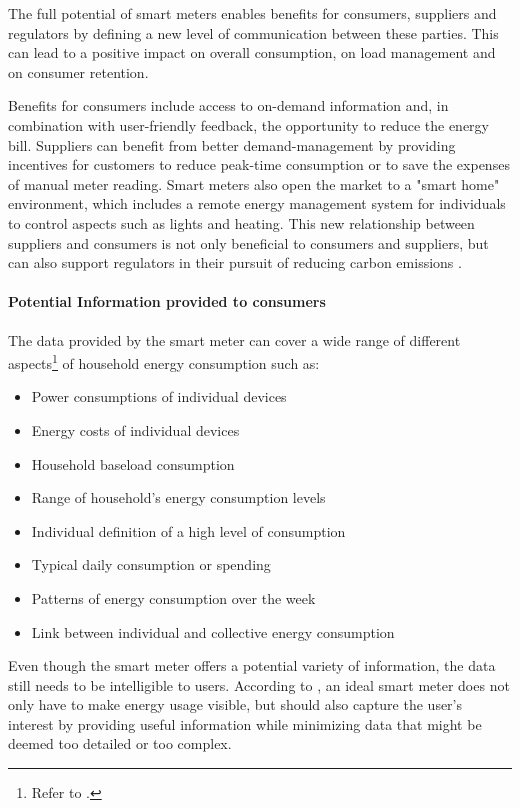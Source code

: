 The full potential of smart meters enables benefits for consumers, suppliers and regulators by defining a new level of communication between these parties.  This can lead to a positive impact on overall consumption, on load management and on consumer retention.

Benefits for consumers include access to on-demand information and, in combination with user-friendly feedback, the opportunity to reduce the energy bill.
Suppliers can benefit from better demand-management by providing incentives for customers to reduce peak-time consumption or to save the expenses of manual meter reading. Smart meters also open the market to a "smart home" environment, which includes a remote energy management system for individuals to control aspects such as lights and heating.
This new relationship between suppliers and consumers is not only beneficial to consumers and suppliers, but can also support regulators in their pursuit of reducing carbon emissions  \citep{Darby2008}.

\paragraph{Potential Information provided to consumers}

The data provided by the smart meter can cover a wide range of different aspects\footnote{Refer to \citep{WillAnderson2009}.} of household energy consumption such as:
    \begin{itemize}
    \item Power consumptions of individual devices
    \item Energy costs of individual devices
    \item Household baseload consumption
    \item Range of household's energy consumption levels
    \item Individual definition of a high level of consumption
    \item Typical daily consumption or spending
    \item Patterns of energy consumption over the week
    \item Link between individual and collective energy consumption
    \end{itemize}%
Even though the smart meter offers a potential variety of information, the data still needs to be intelligible to users. According to \cite{WillAnderson2009}, an ideal smart meter does not only have to make energy usage visible, but should also capture the user's interest by providing useful information while minimizing data that might be deemed too detailed or too complex.


